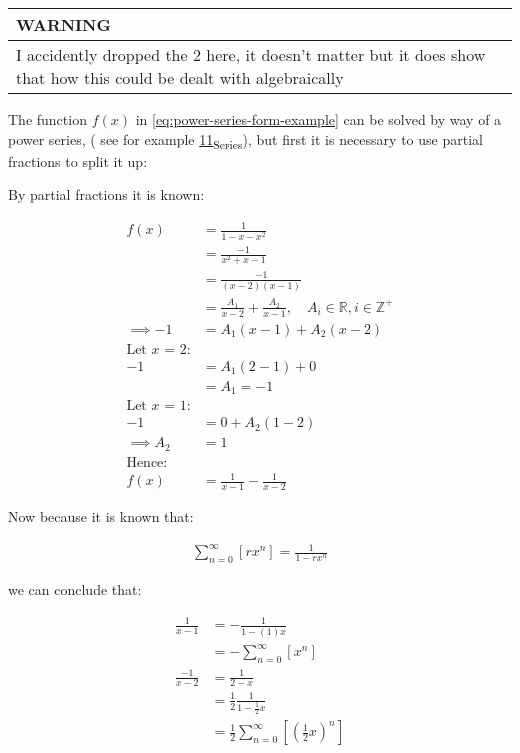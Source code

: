 \documentclass[11pt]{article}
\begin{document}
\begin{center}
\begin{tabular}{l}
WARNING\\
\hline
I accidently dropped the \(2\) here, it doesn't matter but it does show that how this could be dealt with algebraically\\
\end{tabular}
\end{center}

The function \(f(x)\) in \eqref{eq:power-series-form-example} can be solved by way of a power series, ( see for example \href{./University/Analysis/11\_Series.md}{11\textsubscript{Series}}), but first it is
necessary to use partial fractions to split it up:


By partial fractions it is known:

\begin{align*}
    f\left( x \right)&= \frac{1}{1- x- x^2}\\
&= \frac{- 1}{x^2 +  x -  1}\\
&= \frac{- 1}{\left( x- 2 \right)\left( x- 1 \right)}\\
&= \frac{A_1}{x- 2}+  \frac{A_2}{x- 1}, \quad A_i \in \mathbb{R}, i \in \mathbb{Z}^+ \\
 \implies  - 1 &= A_1\left( x- 1 \right) +  A_2\left( x- 2 \right)\\
 \text{Let $x$ = 2:}\\
 - 1&= A_1\left( 2-1 \right) +  0 \\
&= A_1 = - 1 \\
 \text{Let $x$ = 1:}\\
 - 1 &=  0 +  A_2 \left( 1- 2 \right) \\
 \implies  A_2&= 1 \\
 \text{Hence:}\\
 f\left( x \right)&=    \frac{1}{x- 1} - \frac{1}{x- 2}
\end{align*}

Now because it is known that:

\begin{align*}
\sum^{\infty}_{n= 0}\left[ rx^n \right] = \frac{1}{1- rx^n}
\end{align*}

we can conclude that:

\begin{align*}
\frac{1}{x- 1}&= -\frac{1}{1 -\left( 1 \right) x} \\
&= -\sum^{\infty}_{n= 0}\left[ x^n \right]  \\
\frac{-1}{x- 2} &= \frac{1}{2- x} \\
&= \frac{1}{2}\frac{1}{1-\frac{1}{2}x} \\
&= \frac{1}{2} \sum^{\infty}_{n= 0}\left[ \left( \frac{1}{2}x \right) ^n \right]
\end{align*}
\end{document}
